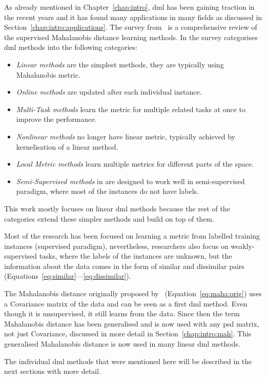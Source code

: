 \documentclass[12pt,a4paper]{report}
\begin{document}
As already mentioned in Chapter~\ref{chap:intro}, \ac{dml} has been gaining traction in the recent years and it has found many applications in many fields as discussed in Section~\ref{chap:intro:applications}. The survey from~\citep{bellet2013survey} is a comprehensive review of the supervised Mahalanobis distance learning methods. In the survey categorises \ac{dml} methods into the following categories: 
\begin{itemize}
\item \textit{Linear methods} are the simplest methods, they are typically using Mahalanobis metric.
\item \textit{Online methods} are updated after each individual instance.
\item \textit{Multi-Task methods} learn the metric for multiple related tasks at once to improve the performance.
\item \textit{Nonlinear methods} no longer have linear metric, typically achieved by kernelisation of a linear method.
\item \textit{Local Metric methods} learn multiple metrics for different parts of the space.
\item \textit{Semi-Supervised methods} in are designed to work well in semi-supervised paradigm, where most of the instances do not have labels.
\end{itemize}
This work mostly focuses on linear \ac{dml} methods because the rest of the categories extend these simpler methods and build on top of them.

Most of the research has been focused on learning a metric from labelled training instances (supervised paradigm), nevertheless, researchers also focus on weakly-supervised tasks, where the labels of the instances are unknown, but the information about the data comes in the form of similar and dissimilar pairs (Equations~\ref{eq:similar}---\ref{eq:dissimilar}).

The Mahalanobis distance originally proposed by~\citep{mahalanobis1936generalized} (Equation~\ref{eq:maha:orig}) uses a Covariance matrix of the data and can be seen as a first \ac{dml} method. Even though it is unsupervised, it still learns from the data. Since then the term Mahalanobis distance has been generalised and is now used with any \ac{psd} matrix, not just Covariance, discussed in more detail in Section~\ref{chap:intro:mah}. This generalised Mahalanobis distance is now used in many linear \ac{dml} methods.

The individual \ac{dml} methods that were mentioned here will be described in the next sections with more detail.
\end{document}
